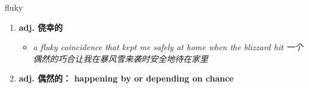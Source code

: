 
\begin{frame}
{\huge fluky}
\begin{center}
\begin{enumerate}\Large
  \item \textbf{adj. 侥幸的}
  \begin{itemize}
    \item \em{\Large{a fluky coincidence that kept me safely at home when the blizzard hit 一个偶然的巧合让我在暴风雪来袭时安全地待在家里}}
  \end{itemize}
  \item \textbf{adj. 偶然的： happening by or depending on chance}
\end{enumerate}
\end{center}
\end{frame}
